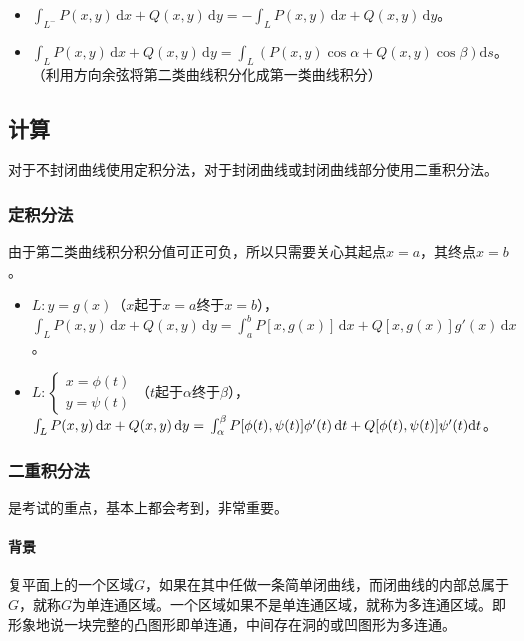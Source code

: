 \documentclass[UTF8, 12pt]{ctexart}
\begin{document}
\begin{itemize}
    \item $\int_{L^-}P(x,y)\,\textrm{d}x+Q(x,y)\,\textrm{d}y=-\int_LP(x,y)\,\textrm{d}x+Q(x,y)\,\textrm{d}y$。
    \item $\int_LP(x,y)\,\textrm{d}x+Q(x,y)\,\textrm{d}y=\int_L(P(x,y)\cos\alpha+Q(x,y)\cos\beta)\textrm{d}s$。（利用方向余弦将第二类曲线积分化成第一类曲线积分）
\end{itemize}

\subsection{计算}

对于不封闭曲线使用定积分法，对于封闭曲线或封闭曲线部分使用二重积分法。

\subsubsection{定积分法}

由于第二类曲线积分积分值可正可负，所以只需要关心其起点$x=a$，其终点$x=b$。

\begin{itemize}
    \item $L:y=g(x)$（$x$起于$x=a$终于$x=b$），$\int_LP(x,y)\,\textrm{d}x+Q(x,y)\,\textrm{d}y=\int_a^bP[x,g(x)]\,\textrm{d}x+Q[x,g(x)]g'(x)\,\textrm{d}x$。
    \item $L:\left\{\begin{array}{c}
        x=\phi(t) \\
        y=\psi(t)
    \end{array}\right.$（$t$起于$\alpha$终于$\beta$），$\int_LP(x,y)\,\textrm{d}x+Q(x,y)\,\textrm{d}y=\\\int_\alpha^\beta P[\phi(t),\psi(t)]\phi'(t)\,\textrm{d}t+Q[\phi(t),\psi(t)]\psi'(t)\textrm{d}t$。 
\end{itemize}

\subsubsection{二重积分法}

是考试的重点，基本上都会考到，非常重要。

\paragraph{背景} \leavevmode \medskip

复平面上的一个区域$G$，如果在其中任做一条简单闭曲线，而闭曲线的内部总属于$G$，就称$G$为单连通区域。一个区域如果不是单连通区域，就称为多连通区域。即形象地说一块完整的凸图形即单连通，中间存在洞的或凹图形为多连通。
\end{document}
